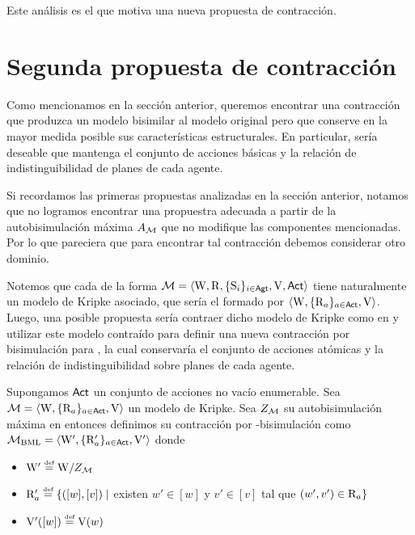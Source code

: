 Este análisis es el que motiva una nueva propuesta de contracción.

\section{Segunda propuesta de contracción}

Como mencionamos en la sección anterior, queremos encontrar una contracción que produzca un modelo bisimilar al modelo original pero que conserve 
en la mayor medida posible sus características estructurales. En particular, sería deseable que mantenga el conjunto de acciones básicas y la relación de 
indistinguibilidad de planes de cada agente.

Si recordamos las primeras propuestas analizadas en la sección anterior, notamos que no logramos encontrar una propuestra adecuada a partir de 
la autobisimulación máxima $A_{\mathcal{M}}$ que no modifique las componentes mencionadas. Por lo que pareciera que para encontrar tal contracción 
debemos considerar otro dominio.  

Notemos que cada \ults de la forma $\mathcal{M}=\langle \mathrm{W},\mathrm{R},\{ \mathrm{S}_i \}_{i \in {\rm \sf Agt}},\mathrm{V},{\rm \sf Act} \rangle$ tiene naturalmente un modelo de Kripke asociado, 
que sería el formado por $\langle \mathrm{W},\{\mathrm{R}_a\}_{a\in{\rm \sf Act}},\mathrm{V} \rangle$. Luego, una posible propuesta sería contraer dicho modelo de Kripke como en 
\bml y utilizar este modelo contraído para definir una nueva contracción por bisimulación para \KHilogic, la cual conservaría el 
conjunto de acciones atómicas y la relación de indistinguibilidad sobre planes de cada agente.

\begin{definicion}
    Supongamos ${\rm \sf Act}$ un conjunto de acciones no vacío enumerable.
    Sea $\mathcal{M} = \langle \mathrm{W},\{\mathrm{R}_a\}_{a\in{\rm \sf Act}},\mathrm{V} \rangle$ un modelo de Kripke. Sea $Z_{\mathcal{M}}$ su autobisimulación máxima en \bml entonces definimos su contracción por \bml-bisimulación como $\mathcal{M}_{\mathrm{BML}} = \langle \mathrm{W}',\{\mathrm{R}'_a\}_{a\in{\rm \sf Act}},\mathrm{V}' \rangle$ donde
    \begin{center}
        \begin{itemize}
            \item $\W' \eqdef \W /Z_\modults$
            \item $\R_a' \eqdef \{([w],[v]) \mid$ existen $w' \in [w]$ y $v' \in [v]$ tal que $(w',v') \in \mathrm{R}_a \}$
            \item $\V'([w]) \eqdef \V(w)$
        \end{itemize}
    \end{center} 
\end{definicion}


